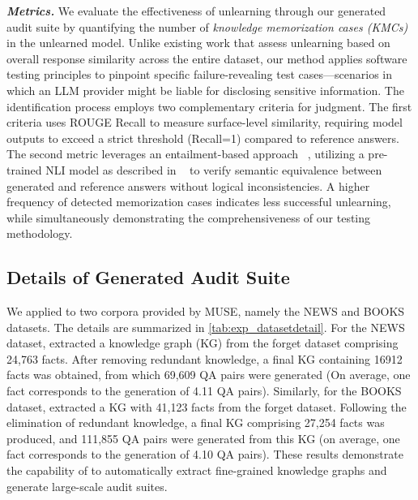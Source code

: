 \textit{\textbf{Metrics.}}
We evaluate the effectiveness of unlearning through our generated audit suite by quantifying the number of \textit{knowledge memorization cases (KMCs)} in the unlearned model. 
Unlike existing work that assess unlearning based on overall response similarity across the entire dataset, our method applies software testing principles to pinpoint specific failure-revealing test cases—scenarios in which an LLM provider might be liable for disclosing sensitive information. 
The identification process employs two complementary criteria for judgment. The first criteria uses ROUGE Recall to measure surface-level similarity, requiring model outputs to exceed a strict threshold (Recall=1) compared to reference answers. 
The second metric leverages an entailment-based approach ~\cite{yuan2024closer}, utilizing a pre-trained NLI model as described in ~\cite{sileo2024tasksource} to verify semantic equivalence between generated and reference answers without logical inconsistencies.
A higher frequency of detected memorization cases indicates less successful unlearning, while simultaneously demonstrating the comprehensiveness of our testing methodology.


\subsection{Details of Generated Audit Suite}



We applied \sys to two corpora provided by MUSE, namely the NEWS and BOOKS datasets.
The details are summarized in \autoref{tab:exp_datasetdetail}.
For the NEWS dataset, \sys extracted a knowledge graph (KG) from the forget dataset comprising 24,763 facts. After removing redundant knowledge, a final KG containing 16912 facts was obtained, from which 69,609 QA pairs were generated (On average, one fact corresponds to the generation of 4.11 QA pairs).
Similarly, for the BOOKS dataset, \sys extracted a KG with 41,123 facts from the forget dataset. Following the elimination of redundant knowledge, a final KG comprising 27,254 facts was produced, and 111,855 QA pairs were generated from this KG (on average, one fact corresponds to the generation of 4.10 QA pairs).
These results demonstrate the capability of \sys to automatically extract fine-grained knowledge graphs and generate large-scale audit suites.


